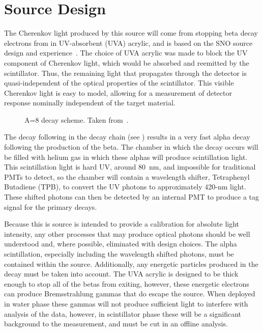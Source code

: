 \section{Source Design}
\label{chap:design}

The Cherenkov light produced by this source will come from stopping beta decay electrons from \Li in UV-absorbent (UVA) acrylic, and is based on the SNO \Li source design and experience~\cite{Tagg:2002,Tagg:2001}.
The choice of UVA acrylic was made to block the UV component of Cherenkov light, which would be absorbed and reemitted by the scintillator.
Thus, the remaining light that propagates through the {\snop} detector is quasi-independent of the optical properties of the {\labppo} scintillator. 
This visible Cherenkov light is easy to model, allowing for a measurement of detector response nominally independent of the target material.

\begin{figure}
\caption{\label{fig:decayscheme} A=8 decay scheme. Taken from~\cite{Tagg:2001}.}
\end{figure}

The decay following \Li in the decay chain (see ) results in a very fast alpha decay following the production of the beta.
The chamber in which the decay occurs will be filled with helium gas in which these alphas will produce scintillation light.
This scintillation light is hard UV, around 80~nm, and impossible for traditional PMTs to detect, so the chamber will contain a wavelength shifter, Tetraphenyl Butadiene (TPB), to convert the UV photons to approximately 420-nm light.
These shifted photons can then be detected by an internal PMT to produce a tag signal for the primary \Li decays.

Because this is source is intended to provide a calibration for absolute light intensity, any other processes that may produce optical photons should be well understood and, where possible, eliminated with design choices.
The alpha scintillation, especially including the wavelength shifted photons, must be contained within the source. 
Additionally, any energetic particles produced in the \Li decay must be taken into account.
The UVA acrylic is designed to be thick enough to stop all of the \Li betas from exiting, however, these energetic electrons can produce Bremsstrahlung gammas that do escape the source.
When deployed in water phase these gammas will not produce sufficient light to interfere with analysis of the data, however, in scintillator phase these will be a significant background to the measurement, and must be cut in an offline analysis. 

